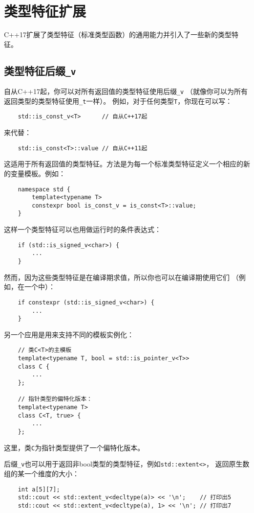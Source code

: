 \chapter{类型特征扩展}\label{ch21}
C++17扩展了类型特征（标准类型函数）的通用能力并引入了一些新的类型特征。


\section{类型特征后缀\texttt{\_v}}\label{ch21.1}
自从C++17起，你可以对所有返回值的类型特征使用后缀\texttt{\_v}
（就像你可以为所有返回类型的类型特征使用\texttt{\_t}一样）。
例如，对于任何类型\texttt{T}，你现在可以写：
\begin{lstlisting}
    std::is_const_v<T>      // 自从C++17起
\end{lstlisting}
来代替：
\begin{lstlisting}
    std::is_const<T>::value // 自从C++11起
\end{lstlisting}
这适用于所有返回值的类型特征。方法是为每一个标准类型特征定义一个相应的新的变量模板。例如：
\begin{lstlisting}
    namespace std {
        template<typename T>
        constexpr bool is_const_v = is_const<T>::value;
    }
\end{lstlisting}
这样一个类型特征可以也用做运行时的条件表达式：
\begin{lstlisting}
    if (std::is_signed_v<char>) {
        ...
    }
\end{lstlisting}
然而，因为这些类型特征是在编译期求值，所以你也可以在编译期使用它们
（例如，在一个中）：
\begin{lstlisting}
    if constexpr (std::is_signed_v<char>) {
        ...
    }
\end{lstlisting}
另一个应用是用来支持不同的模板实例化：
\begin{lstlisting}
    // 类C<T>的主模板
    template<typename T, bool = std::is_pointer_v<T>>
    class C {
        ...
    };

    // 指针类型的偏特化版本：
    template<typename T>
    class C<T, true> {
        ...
    };
\end{lstlisting}
这里，类\texttt{C}为指针类型提供了一个偏特化版本。

后缀\texttt{\_v}也可以用于返回非bool类型的类型特征，例如\texttt{std::extent<>}，
返回原生数组的某一个维度的大小：
\begin{lstlisting}
    int a[5][7];
    std::cout << std::extent_v<decltype(a)> << '\n';    // 打印出5
    std::cout << std::extent_v<decltype(a), 1> << '\n'; // 打印出7
\end{lstlisting}


